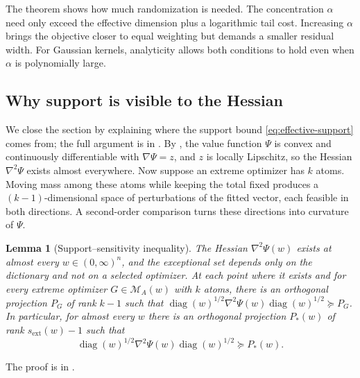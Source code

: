 \documentclass[11pt]{article}
\newtheorem{lemma}{Lemma}
\theoremstyle{definition}
\theoremstyle{remark}
\DeclareMathOperator{\diag}{diag}
\newcommand{\Mcal}{\mathcal M}
\newcommand{\sext}{s_{\mathrm{ext}}}
\begin{document}
The theorem shows how much randomization is needed.  The concentration
$\alpha$ need only exceed the effective dimension plus a logarithmic tail
cost.  Increasing $\alpha$ brings the objective closer to equal weighting but
demands a smaller residual width.  For Gaussian kernels, analyticity allows
both conditions to hold even when $\alpha$ is polynomially large.

\subsection{Why support is visible to the Hessian}

We close the section by explaining where the support bound
\eqref{eq:effective-support} comes from; the full argument is in
.  By , the value function $\Psi$
is convex and continuously differentiable with $\nabla\Psi=z$, and $z$ is
locally Lipschitz, so the Hessian $\nabla^2\Psi$ exists almost everywhere.
Now suppose an extreme optimizer has $k$ atoms.  Moving mass among these
atoms while keeping the total fixed produces a $(k-1)$-dimensional space of
perturbations of the fitted vector, each feasible in both directions.  A
second-order comparison turns these directions into curvature of $\Psi$.

\begin{lemma}[Support--sensitivity inequality]
\label{lem:hessian-summary}
The Hessian $\nabla^2\Psi(w)$ exists at almost every $w\in(0,\infty)^n$,
and the exceptional set depends only on the dictionary and not on a
selected optimizer.  At each point where it exists and for every extreme
optimizer $G\in\Mcal_A(w)$ with $k$ atoms, there is an orthogonal projection
$P_G$ of rank $k-1$ such that
$\diag(w)^{1/2}\nabla^2\Psi(w)\diag(w)^{1/2}\succeq P_G$.  In particular,
for almost every $w$ there is an orthogonal projection $P_*(w)$ of rank
$\sext(w)-1$ such that
\begin{equation}\label{eq:hessian-summary}
 \diag(w)^{1/2}\nabla^2\Psi(w)\diag(w)^{1/2}\succeq P_*(w).
\end{equation}
\end{lemma}

The proof is in .
\end{document}
